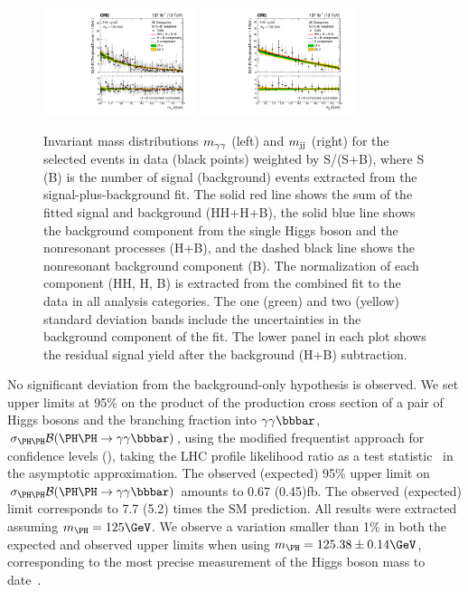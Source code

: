 \documentclass[11pt,twoside,a4paper,cmspaper,final,collab]{cms-tdr}
\begin{document}
\begin{figure}[htbp]
 \centering
\includegraphics[width=0.40\textwidth]{Figure_009-a.pdf}
\includegraphics[width=0.40\textwidth]{Figure_009-b.pdf}
  \caption{
Invariant mass distributions $m_{\gamma\gamma}$ (left) and $m_\text{jj}$ (right) for the selected events in data (black points) weighted by S/(S+B),
        where S (B) is the number of signal (background) events extracted from the signal-plus-background fit.
 The solid red line shows the sum of the fitted signal and background (HH+H+B), the solid blue line shows the background component from the single Higgs boson and the nonresonant processes (H+B), and the dashed black line shows the nonresonant background component (B). The normalization of each component (HH, H, B) is extracted from the combined fit to the data in all analysis categories. The one (green) and two (yellow) standard
  deviation bands include the uncertainties in the background component
  of the fit. The lower panel in each plot shows the residual signal yield after the
 background (H+B) subtraction.} 
 \label{fig:wall_mgg_mjj}
\end{figure}


No significant deviation from the background-only hypothesis is observed. We set upper limits at 95\% \CL on the product of the production cross section of a pair of Higgs bosons and the branching fraction into $\bbgg$, $\sigmaHH \BR$, using the modified frequentist approach for confidence levels (\CLs), taking the LHC profile likelihood ratio 
as a test statistic~\cite{CLS2,CLS1,CLSA,CMS-NOTE-2011-005} in the asymptotic approximation. The observed (expected) 95\% \CL upper limit on $\sigmaHH \BR$
 amounts to 0.67 (0.45)\unit{fb}. The observed (expected) limit corresponds to 7.7 (5.2) times the SM prediction. 
 All results were extracted assuming $\mH = 125 \GeV$. We observe a variation smaller than 1\% in both the expected and observed upper limits when using $\mH = 125.38 \pm 0.14\GeV$, corresponding to the most precise measurement of the
Higgs boson mass to date~\cite{Sirunyan:2020xwk}.
\end{document}
